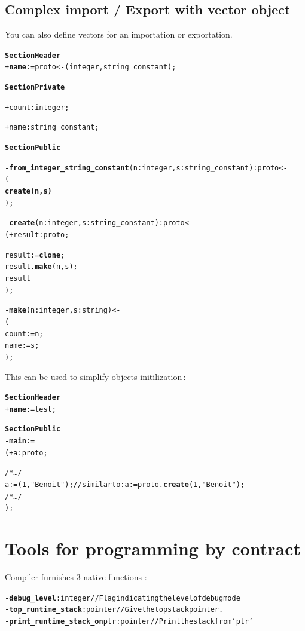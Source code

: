 \documentclass[11pt]{mybook}
\begin{document}
\subsection{Complex import / Export with vector object}
You can also define vectors for an importation or exportation.
\begin{alltt}
{\bf{}Section Header}
  + {\bf{}name} := {\sc{}proto <- (integer, string\_constant)};

{\bf{}Section Private}

  + count:{\sc{}integer};

  + name:{\sc{}string\_constant};

{\bf{}Section Public}

  - {\bf{}from\_integer\_string\_constant} (n:{\sc{}integer}, s:{\sc{}string\_constant}) :{\sc{}proto} <- 
  ( 
    {\bf{}create (n,s)}
  );

  - {\bf{}create} (n:{\sc{}integer}, s:{\sc{}string\_constant}) :{\sc{}proto} <- 
  ( + result:{\sc{}proto};

    result := {\bf{}clone};
    result.{\bf{}make} (n,s);
    result
  );

  - {\bf{}make} (n:{\sc{}integer}, s:{\sc{}string}) <- 
  ( 
    count := n;
    name  := s; 
  );
\end{alltt}

This can be used to simplify objects initilization\,:
\begin{alltt}
{\bf{}Section Header}
  + {\bf{}name} := {\sc{}test};

{\bf{}Section Public}
  - {\bf{}main} := 
  ( + a:{\sc{}proto};
    
    /* \ldots */
     a := (1, "Benoit");  // similar to: a := {\sc{}proto}.{\bf{}create} (1, "Benoit");
    /* \ldots */
  );
\end{alltt}

\section{Tools for programming by contract}
\label{language_reference:contract}
%
Compiler furnishes 3 native functions :
\begin{alltt}
  - {\bf{}debug\_level}:{\sc{}integer}         // Flag indicating the level of debug mode
  - {\bf{}top\_runtime\_stack}:{\sc{}pointer}  // Give the top stack pointer.
  - {\bf{}print\_runtime\_stack\_on} ptr:{\sc{}pointer} // Print the stack from {\tt{}`ptr'}
\end{alltt}
\end{document}
